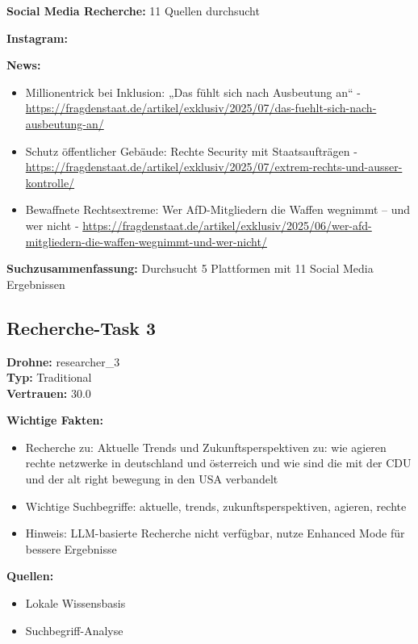 \documentclass[12pt,a4paper]{article}
\begin{document}
\textbf{Social Media Recherche:} 11 Quellen durchsucht

\textbf{Instagram:}
\begin{itemize}
\end{itemize}

\textbf{News:}
\begin{itemize}
\item Millionentrick bei Inklusion: „Das fühlt sich nach Ausbeutung an“ - \url{https://fragdenstaat.de/artikel/exklusiv/2025/07/das-fuehlt-sich-nach-ausbeutung-an/}
\item Schutz öffentlicher Gebäude: Rechte Security mit Staatsaufträgen - \url{https://fragdenstaat.de/artikel/exklusiv/2025/07/extrem-rechts-und-ausser-kontrolle/}
\item Bewaffnete Rechtsextreme: Wer AfD-Mitgliedern die Waffen wegnimmt – und wer nicht - \url{https://fragdenstaat.de/artikel/exklusiv/2025/06/wer-afd-mitgliedern-die-waffen-wegnimmt-und-wer-nicht/}
\end{itemize}

\textbf{Suchzusammenfassung:} Durchsucht 5 Plattformen mit 11 Social Media Ergebnissen

\subsection{Recherche-Task 3}

\textbf{Drohne:} researcher\_3\\
\textbf{Typ:} Traditional\\
\textbf{Vertrauen:} 30.0%

\textbf{Wichtige Fakten:}
\begin{itemize}
\item Recherche zu: Aktuelle Trends und Zukunftsperspektiven zu: wie agieren rechte netzwerke in deutschland und österreich und wie sind die mit der CDU und der alt right bewegung in den USA verbandelt
\item Wichtige Suchbegriffe: aktuelle, trends, zukunftsperspektiven, agieren, rechte
\item Hinweis: LLM-basierte Recherche nicht verfügbar, nutze Enhanced Mode für bessere Ergebnisse
\end{itemize}

\textbf{Quellen:}
\begin{itemize}
\item Lokale Wissensbasis
\item Suchbegriff-Analyse
\end{itemize}
\end{document}
